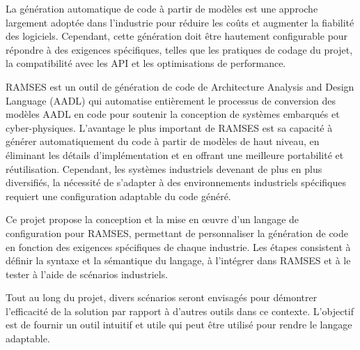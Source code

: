 
%

La génération automatique de code à partir de modèles est une approche largement adoptée dans l'industrie pour réduire les coûts et augmenter la fiabilité des logiciels. Cependant, cette génération doit être hautement configurable pour répondre à des exigences spécifiques, telles que les pratiques de codage du projet, la compatibilité avec les API et les optimisations de performance.

RAMSES est un outil de génération de code de Architecture Analysis and Design Language (AADL) qui automatise entièrement le processus de conversion des modèles AADL en code pour soutenir la conception de systèmes embarqués et cyber-physiques. L'avantage le plus important de RAMSES est sa capacité à générer automatiquement du code à partir de modèles de haut niveau, en éliminant les détails d'implémentation et en offrant une meilleure portabilité et réutilisation. Cependant, les systèmes industriels devenant de plus en plus diversifiés, la nécessité de s'adapter à des environnements industriels spécifiques requiert une configuration adaptable du code généré.

Ce projet propose la conception et la mise en œuvre d'un langage de configuration pour RAMSES, permettant de personnaliser la génération de code en fonction des exigences spécifiques de chaque industrie. Les étapes consistent à définir la syntaxe et la sémantique du langage, à l'intégrer dans RAMSES et à le tester à l'aide de scénarios industriels.

Tout au long du projet, divers scénarios seront envisagés pour démontrer l'efficacité de la solution par rapport à d'autres outils dans ce contexte. L'objectif est de fournir un outil intuitif et utile qui peut être utilisé pour rendre le langage adaptable.

